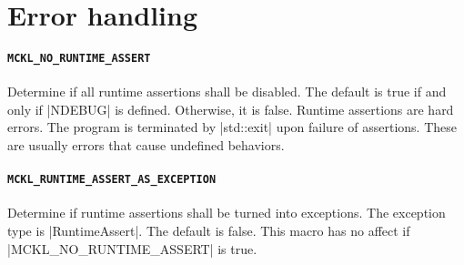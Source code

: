 \section{Error handling}
\label{sec:Error handling}

\paragraph{\texttt{MCKL\_NO\_RUNTIME\_ASSERT}} Determine if all runtime
assertions shall be disabled. The default is true if and only if |NDEBUG| is
defined. Otherwise, it is false. Runtime assertions are hard errors. The
program is terminated by |std::exit| upon failure of assertions. These are
usually errors that cause undefined behaviors.

\paragraph{\texttt{MCKL\_RUNTIME\_ASSERT\_AS\_EXCEPTION}} Determine if runtime
assertions shall be turned into exceptions. The exception type is
|RuntimeAssert|. The default is false. This macro has no affect if
|MCKL_NO_RUNTIME_ASSERT| is true.
